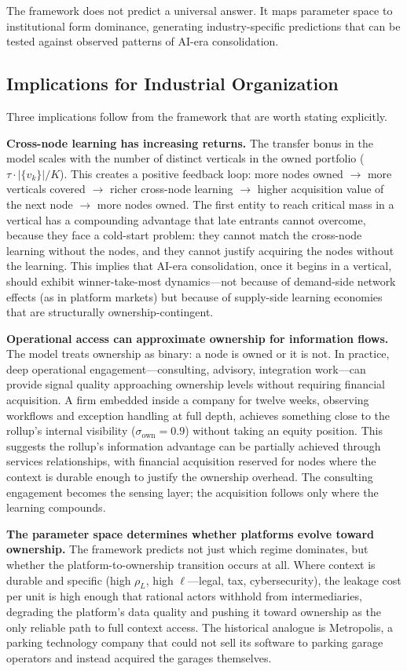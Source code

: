 \documentclass[12pt]{article}
\theoremstyle{definition}
\begin{document}
\noindent The framework does not predict a universal answer. It maps parameter space to institutional form dominance, generating industry-specific predictions that can be tested against observed patterns of AI-era consolidation.

\subsection{Implications for Industrial Organization}

Three implications follow from the framework that are worth stating explicitly.

\textbf{Cross-node learning has increasing returns.} The transfer bonus in the model scales with the number of distinct verticals in the owned portfolio ($\tau \cdot |\{v_k\}| / K$). This creates a positive feedback loop: more nodes owned $\to$ more verticals covered $\to$ richer cross-node learning $\to$ higher acquisition value of the next node $\to$ more nodes owned. The first entity to reach critical mass in a vertical has a compounding advantage that late entrants cannot overcome, because they face a cold-start problem: they cannot match the cross-node learning without the nodes, and they cannot justify acquiring the nodes without the learning. This implies that AI-era consolidation, once it begins in a vertical, should exhibit winner-take-most dynamics---not because of demand-side network effects (as in platform markets) but because of supply-side learning economies that are structurally ownership-contingent.

\textbf{Operational access can approximate ownership for information flows.} The model treats ownership as binary: a node is owned or it is not. In practice, deep operational engagement---consulting, advisory, integration work---can provide signal quality approaching ownership levels without requiring financial acquisition. A firm embedded inside a company for twelve weeks, observing workflows and exception handling at full depth, achieves something close to the rollup's internal visibility ($\sigma_{\text{own}} = 0.9$) without taking an equity position. This suggests the rollup's information advantage can be partially achieved through services relationships, with financial acquisition reserved for nodes where the context is durable enough to justify the ownership overhead. The consulting engagement becomes the sensing layer; the acquisition follows only where the learning compounds.

\textbf{The parameter space determines whether platforms evolve toward ownership.} The framework predicts not just which regime dominates, but whether the platform-to-ownership transition occurs at all. Where context is durable and specific (high $\rho_L$, high $\ell$---legal, tax, cybersecurity), the leakage cost per unit is high enough that rational actors withhold from intermediaries, degrading the platform's data quality and pushing it toward ownership as the only reliable path to full context access. The historical analogue is Metropolis, a parking technology company that could not sell its software to parking garage operators and instead acquired the garages themselves.
\end{document}
